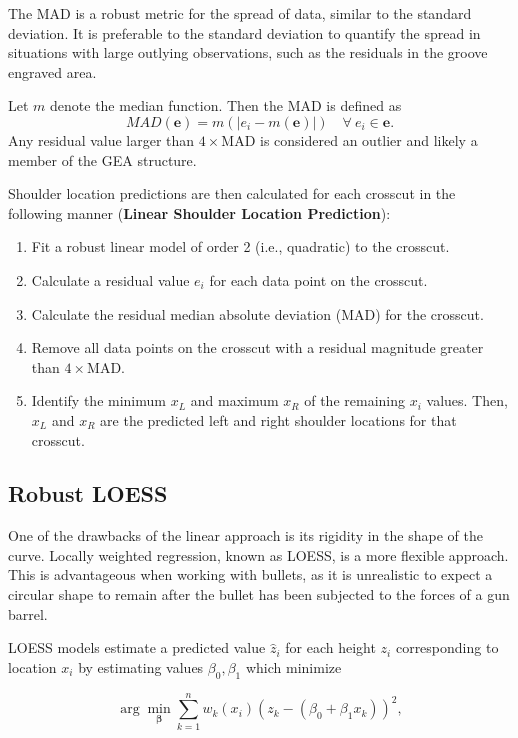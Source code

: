 \documentclass[12pt]{article}
\begin{document}
The MAD is a robust metric for the spread of data, similar to the
standard deviation. It is preferable to the standard deviation to
quantify the spread in situations with large outlying observations, such
as the residuals in the groove engraved area.

Let \(m\) denote the median function. Then the MAD is defined as
\[ MAD(\mathbf{e}) = m(|e_i- m(\mathbf{e})|) \quad \forall\ e_i \in \mathbf{e}.\]
Any residual value larger than \(4 \times\)MAD is considered an outlier
and likely a member of the GEA structure.

Shoulder location predictions are then calculated for each crosscut in
the following manner (\textbf{Linear Shoulder Location Prediction}):\\

\begin{enumerate}
\item Fit a robust linear model of order 2 (i.e., quadratic) to the crosscut.   
\item Calculate a residual value $e_i$ for each data point on the crosscut.  
\item Calculate the residual median absolute deviation (MAD) for the crosscut.  
\item Remove all data points on the crosscut with a residual magnitude greater than $4 \times$MAD.  
\item Identify the minimum $x_{L}$ and maximum $x_{R}$ of the remaining $x_i$ values. Then, $x_L$ and $x_R$ are the predicted left and right shoulder locations for that crosscut.   
\end{enumerate}

\subsection{Robust LOESS}

One of the drawbacks of the linear approach is its rigidity in the shape
of the curve. Locally weighted regression, known as LOESS, is a more
flexible approach. This is advantageous when working with bullets, as it
is unrealistic to expect a circular shape to remain after the bullet has
been subjected to the forces of a gun barrel.

LOESS models estimate a predicted value \(\widehat{z}_i\) for each
height \(z_i\) corresponding to location \(x_i\) by estimating values
\(\beta_0, \beta_1\) which minimize

\begin{equation}\label{eq:RobLOESS} \arg\min_{\mathbf{\beta}} \sum_{k=1}^n w_k(x_{i})\left(z_{k} - (\beta_0 + \beta_1x_k)\right)^2,\end{equation}
\end{document}
